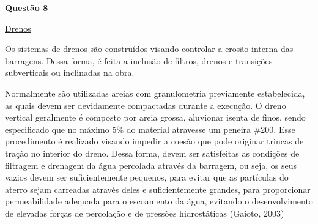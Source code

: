 \item[]\textbf{Questão 8}

\href{http://professor.pucgoias.edu.br/SiteDocente/admin/arquivosUpload/15030/material/barragem_terra_4.pdf}{Drenos}

Os sistemas de drenos são construídos visando controlar a erosão interna das barragens. Dessa forma, é feita a inclusão de filtros, drenos e transições subverticais ou inclinadas na obra.

Normalmente são utilizadas areias com granulometria previamente estabelecida, as quais devem ser devidamente compactadas durante a execução. O dreno vertical geralmente é composto por areia grossa, aluvionar isenta de finos, sendo especificado que no máximo 5\% do material atravesse um peneira \#200. Esse procedimento é realizado visando impedir a coesão que pode originar trincas de tração no interior do dreno. Dessa forma, devem ser satisfeitas as condições de filtragem e drenagem da água percolada através da barragem, ou seja, os seus vazios devem ser suficientemente pequenos, para evitar que as partículas do aterro sejam carreadas através deles e suficientemente grandes, para proporcionar permeabilidade adequada para o escoamento da água, evitando o desenvolvimento de elevadas forças de percolação e de pressões hidrostáticas (Gaioto, 2003) 